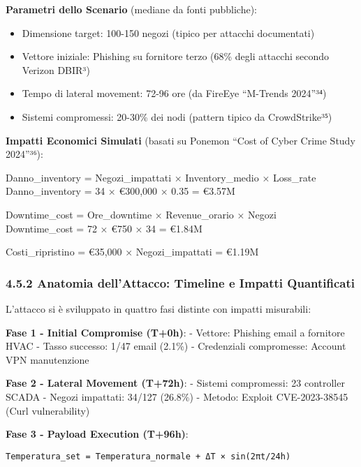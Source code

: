 \documentclass{report}
\begin{document}
\textbf{Parametri dello Scenario} (mediane da fonti pubbliche):

\begin{itemize}
\tightlist
\item
  Dimensione target: 100-150 negozi (tipico per attacchi documentati)\\
\item
  Vettore iniziale: Phishing su fornitore terzo (68\% degli attacchi
  secondo Verizon DBIR³)\\
\item
  Tempo di lateral movement: 72-96 ore (da FireEye ``M-Trends
  2024''³⁴)\\
\item
  Sistemi compromessi: 20-30\% dei nodi (pattern tipico da
  CrowdStrike³⁵)
\end{itemize}

\textbf{Impatti Economici Simulati} (basati su Ponemon ``Cost of Cyber
Crime Study 2024''³⁶):

Danno\_inventory = Negozi\_impattati × Inventory\_medio × Loss\_rate\\
Danno\_inventory = 34 × €300,000 × 0.35 = €3.57M

Downtime\_cost = Ore\_downtime × Revenue\_orario × Negozi\\
Downtime\_cost = 72 × €750 × 34 = €1.84M

Costi\_ripristino = €35,000 × Negozi\_impattati = €1.19M

\subsubsection{4.5.2 Anatomia dell'Attacco: Timeline e Impatti
Quantificati}\label{anatomia-dellattacco-timeline-e-impatti-quantificati}

L'attacco si è sviluppato in quattro fasi distinte con impatti
misurabili:

\textbf{Fase 1 - Initial Compromise (T+0h)}: - Vettore: Phishing email a
fornitore HVAC - Tasso successo: 1/47 email (2.1\%) - Credenziali
compromesse: Account VPN manutenzione

\textbf{Fase 2 - Lateral Movement (T+72h)}: - Sistemi compromessi: 23
controller SCADA - Negozi impattati: 34/127 (26.8\%) - Metodo: Exploit
CVE-2023-38545 (Curl vulnerability)

\textbf{Fase 3 - Payload Execution (T+96h)}:

\begin{verbatim}
Temperatura_set = Temperatura_normale + ΔT × sin(2πt/24h)
\end{verbatim}
\end{document}
